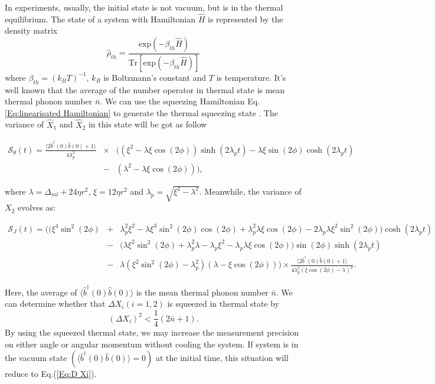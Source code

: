 \documentclass[pra,aps,superscriptaddress,showpacs,preprint]{revtex4}%
\begin{document}
In experiments, usually, the initial state is not vacuum, but is in the thermal equilibrium. The state of a system with Hamiltonian $\hat{H}$ is represented by the density matrix
\begin{equation}
\hat{\rho}_{th}=\frac{\mathrm{exp}(-\beta_{th}\hat{H})}{\mathrm{Tr}[\mathrm{exp}(-\beta_{th}\hat{H})]}
\label{Eq:thermal state}
\end{equation}
where $\beta_{th}=(k_{B}T)^{-1}$, $k_{B}$ is Boltzmann's constant and $T$ is temperature. It's well known that the average of the number operator in thermal state is mean thermal phonon number $\bar{n}$. We can use the squeezing Hamiltonian Eq. \eqref{Eq:linearisated Hamiltonian} to generate the thermal squeezing state \cite{Rashid2016}.
The variance of $\hat{X}_{1}$ and $\hat{X}_{2}$ in this state will be got
as follow
\begin{widetext}
\begin{eqnarray}
\mathcal{S}_{\theta}(t)=\frac{\langle2\hat{b}^{\dag}(0)\hat{b}(0)+1\rangle}{4\lambda_{p}^{2}}&\times&\Big((\xi^{2}-\lambda\xi\cos(2\phi))\sinh(2\lambda_{p}t)-\lambda\xi\sin(2\phi)\cosh(2\lambda_{p}t)\nonumber\\
&-&(\lambda^{2}-\lambda\xi\cos(2\phi))\Big)
\label{Eq:Vx1},
\end{eqnarray}
\end{widetext}
where $\lambda=\Delta_{ml}+24\eta r^{2}$, $\xi=12\eta r^{2}$ and $\lambda_{p}=\sqrt{\xi^{2}-\lambda^{2}}$. Meanwhile, the variance of $X_{2}$ evolves as:
\begin{widetext}
\begin{eqnarray}
\mathcal{S}_{J}(t)=\Big(\big(\xi^4\sin^2(2\phi)&+&\lambda_{p}^2\xi^2-\lambda\xi^3\sin^{2}(2\phi)\cos(2\phi)+\lambda_{p}^2\lambda\xi\cos(2\phi)-2\lambda_{p}\lambda\xi^{2}\sin^{2}(2\phi)\big)\cosh(2\lambda_{p}t)\nonumber\\
&-&\big(\lambda\xi^2\sin^2(2\phi)+\lambda_{p}^2\lambda-\lambda_{p}\xi^{2}-\lambda_{p}\lambda\xi\cos(2\phi)\big)\sin(2\phi)\sinh(2\lambda_{p}t)\nonumber\\
&-&\lambda(\xi^{2}\sin^2(2\phi)-\lambda_{p}^{2})(\lambda-\xi\cos(2\phi))\Big)\times\frac{\langle2\hat{b}^{\dag}(0)\hat{b}(0)+1\rangle}{4\lambda_{p}^2(\xi\cos(2\phi)-\lambda)^2}
\label{Eq:Vx2}.
\end{eqnarray}
\end{widetext}

Here, the average of $\langle\hat{b}^{\dag}(0)\hat{b}(0)\rangle$ is the mean thermal phonon number $\bar{n}$. We can determine whether that $\Delta X_{\mathit{i}}(\mathit{i}=1,2)$ is squeezed in thermal state by \cite{Rashid2016}
\begin{equation}
(\Delta X_{\textit{i}})^{2}<\frac{1}{4}(2\bar{n}+1)
\label{Eq:thermal D Xi}.
\end{equation}
By using the squeezed thermal state, we may increase the measurement precision on either angle or angular momentum without cooling the system.
 If system is in the vacuum state $(\langle\hat{b}^{\dag}(0)\hat{b}(0)\rangle=0)$ at the initial time, this situation will reduce to Eq.(\ref{Eq:D Xi}).
\end{document}
